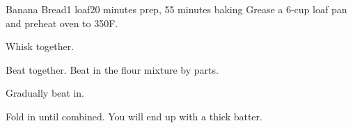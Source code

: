 \documentclass[../Cookbook.tex]{subfiles}
\begin{document}
\begin{recipe}{Banana Bread}{1 loaf}{20 minutes prep, 55 minutes baking}
	Grease a 6-cup loaf pan and preheat oven to 350\0F.

	Whisk together.

	Beat together. Beat in the flour mixture by parts.

	Gradually beat in.

	Fold in until combined. You will end up with a thick batter.
\end{recipe}
\end{document}

